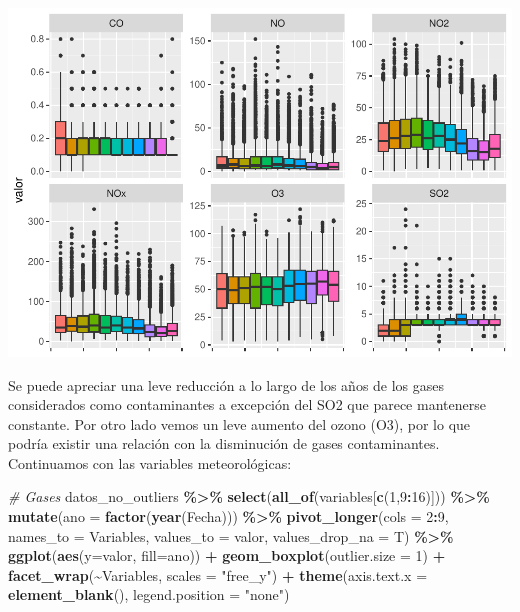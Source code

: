 \documentclass[notspecified,article,submit,moreauthors,pdftex]{Definitions/mdpi}
\newenvironment{Shaded}{\begin{snugshade}}{\end{snugshade}}
\newcommand{\AttributeTok}[1]{\textcolor[rgb]{0.13,0.29,0.53}{#1}}
\newcommand{\CommentTok}[1]{\textcolor[rgb]{0.56,0.35,0.01}{\textit{#1}}}
\newcommand{\DecValTok}[1]{\textcolor[rgb]{0.00,0.00,0.81}{#1}}
\newcommand{\FunctionTok}[1]{\textcolor[rgb]{0.13,0.29,0.53}{\textbf{#1}}}
\newcommand{\NormalTok}[1]{#1}
\newcommand{\SpecialCharTok}[1]{\textcolor[rgb]{0.81,0.36,0.00}{\textbf{#1}}}
\newcommand{\StringTok}[1]{\textcolor[rgb]{0.31,0.60,0.02}{#1}}
\begin{document}
\includegraphics{ProyectoAED2023_plantilla_files/figure-latex/unnamed-chunk-21-1.pdf}

Se puede apreciar una leve reducción a lo largo de los años de los gases
considerados como contaminantes a excepción del SO2 que parece
mantenerse constante. Por otro lado vemos un leve aumento del ozono
(O3), por lo que podría existir una relación con la disminución de gases
contaminantes. Continuamos con las variables meteorológicas:

\begin{Shaded}
\begin{Highlighting}[]
\CommentTok{\# Gases}
\NormalTok{datos\_no\_outliers }\SpecialCharTok{\%\textgreater{}\%}
  \FunctionTok{select}\NormalTok{(}\FunctionTok{all\_of}\NormalTok{(variables[}\FunctionTok{c}\NormalTok{(}\DecValTok{1}\NormalTok{,}\DecValTok{9}\SpecialCharTok{:}\DecValTok{16}\NormalTok{)])) }\SpecialCharTok{\%\textgreater{}\%}
  \FunctionTok{mutate}\NormalTok{(}\AttributeTok{ano =} \FunctionTok{factor}\NormalTok{(}\FunctionTok{year}\NormalTok{(Fecha))) }\SpecialCharTok{\%\textgreater{}\%}
  \FunctionTok{pivot\_longer}\NormalTok{(}\AttributeTok{cols =} \DecValTok{2}\SpecialCharTok{:}\DecValTok{9}\NormalTok{, }\AttributeTok{names\_to =} \StringTok{\textquotesingle{}Variables\textquotesingle{}}\NormalTok{, }\AttributeTok{values\_to =} \StringTok{\textquotesingle{}valor\textquotesingle{}}\NormalTok{, }\AttributeTok{values\_drop\_na =}\NormalTok{ T) }\SpecialCharTok{\%\textgreater{}\%}
  \FunctionTok{ggplot}\NormalTok{(}\FunctionTok{aes}\NormalTok{(}\AttributeTok{y=}\NormalTok{valor, }\AttributeTok{fill=}\NormalTok{ano)) }\SpecialCharTok{+} 
  \FunctionTok{geom\_boxplot}\NormalTok{(}\AttributeTok{outlier.size =} \DecValTok{1}\NormalTok{) }\SpecialCharTok{+}
  \FunctionTok{facet\_wrap}\NormalTok{(}\SpecialCharTok{\textasciitilde{}}\NormalTok{Variables, }\AttributeTok{scales =} \StringTok{"free\_y"}\NormalTok{) }\SpecialCharTok{+} 
  \FunctionTok{theme}\NormalTok{(}\AttributeTok{axis.text.x =} \FunctionTok{element\_blank}\NormalTok{(), }\AttributeTok{legend.position =} \StringTok{"none"}\NormalTok{)}
\end{Highlighting}
\end{Shaded}
\end{document}
